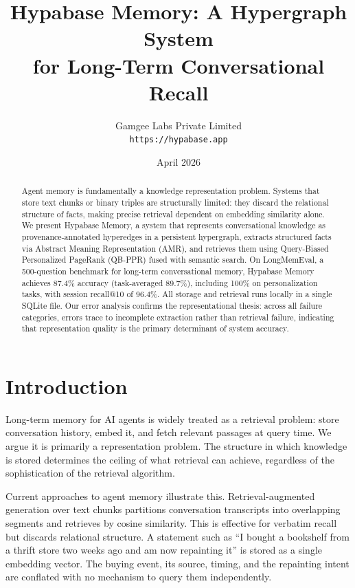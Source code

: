 \documentclass[11pt,a4paper]{article}
\title{%
  \textbf{Hypabase Memory: A Hypergraph System\\for Long-Term Conversational Recall}
}
\author{%
  Gamgee Labs Private Limited\\
  \texttt{https://hypabase.app}
}
\date{April 2026}
\begin{document}
\maketitle
\thispagestyle{fancy}

\begin{abstract}
Agent memory is fundamentally a knowledge representation problem. Systems that store text chunks or binary triples are structurally limited: they discard the relational structure of facts, making precise retrieval dependent on embedding similarity alone. We present Hypabase Memory, a system that represents conversational knowledge as provenance-annotated hyperedges in a persistent hypergraph, extracts structured facts via Abstract Meaning Representation (AMR), and retrieves them using Query-Biased Personalized PageRank (QB-PPR) fused with semantic search. On LongMemEval, a 500-question benchmark for long-term conversational memory, Hypabase Memory achieves 87.4\% accuracy (task-averaged 89.7\%), including 100\% on personalization tasks, with session recall@10 of 96.4\%. All storage and retrieval runs locally in a single SQLite file. Our error analysis confirms the representational thesis: across all failure categories, errors trace to incomplete extraction rather than retrieval failure, indicating that representation quality is the primary determinant of system accuracy.
\end{abstract}

\section{Introduction}

Long-term memory for AI agents is widely treated as a retrieval problem: store conversation history, embed it, and fetch relevant passages at query time. We argue it is primarily a representation problem. The structure in which knowledge is stored determines the ceiling of what retrieval can achieve, regardless of the sophistication of the retrieval algorithm.

Current approaches to agent memory illustrate this. Retrieval-augmented generation over text chunks partitions conversation transcripts into overlapping segments and retrieves by cosine similarity. This is effective for verbatim recall but discards relational structure. A statement such as ``I bought a bookshelf from a thrift store two weeks ago and am now repainting it'' is stored as a single embedding vector. The buying event, its source, timing, and the repainting intent are conflated with no mechanism to query them independently.
\end{document}
